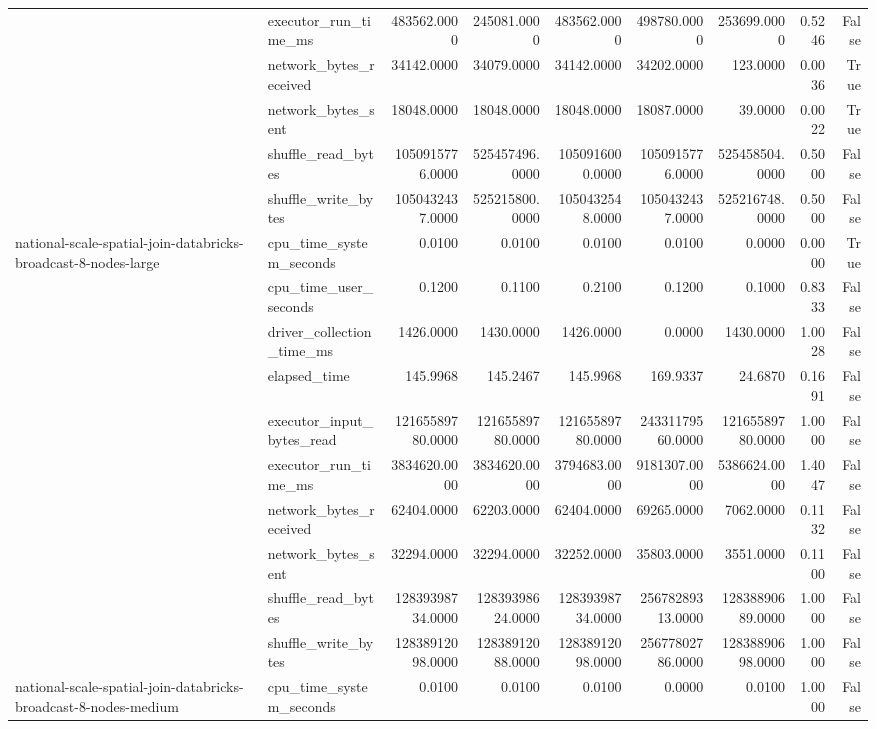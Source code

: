 \begin{tabular}{llrrrrrrr}
 & executor\_run\_time\_ms & 483562.0000 & 245081.0000 & 483562.0000 & 498780.0000 & 253699.0000 & 0.5246 & False \\
 & network\_bytes\_received & 34142.0000 & 34079.0000 & 34142.0000 & 34202.0000 & 123.0000 & 0.0036 & True \\
 & network\_bytes\_sent & 18048.0000 & 18048.0000 & 18048.0000 & 18087.0000 & 39.0000 & 0.0022 & True \\
 & shuffle\_read\_bytes & 1050915776.0000 & 525457496.0000 & 1050916000.0000 & 1050915776.0000 & 525458504.0000 & 0.5000 & False \\
 & shuffle\_write\_bytes & 1050432437.0000 & 525215800.0000 & 1050432548.0000 & 1050432437.0000 & 525216748.0000 & 0.5000 & False \\
\cline{1-9}
\multirow[t]{10}{*}{national-scale-spatial-join-databricks-broadcast-8-nodes-large} & cpu\_time\_system\_seconds & 0.0100 & 0.0100 & 0.0100 & 0.0100 & 0.0000 & 0.0000 & True \\
 & cpu\_time\_user\_seconds & 0.1200 & 0.1100 & 0.2100 & 0.1200 & 0.1000 & 0.8333 & False \\
 & driver\_collection\_time\_ms & 1426.0000 & 1430.0000 & 1426.0000 & 0.0000 & 1430.0000 & 1.0028 & False \\
 & elapsed\_time & 145.9968 & 145.2467 & 145.9968 & 169.9337 & 24.6870 & 0.1691 & False \\
 & executor\_input\_bytes\_read & 12165589780.0000 & 12165589780.0000 & 12165589780.0000 & 24331179560.0000 & 12165589780.0000 & 1.0000 & False \\
 & executor\_run\_time\_ms & 3834620.0000 & 3834620.0000 & 3794683.0000 & 9181307.0000 & 5386624.0000 & 1.4047 & False \\
 & network\_bytes\_received & 62404.0000 & 62203.0000 & 62404.0000 & 69265.0000 & 7062.0000 & 0.1132 & False \\
 & network\_bytes\_sent & 32294.0000 & 32294.0000 & 32252.0000 & 35803.0000 & 3551.0000 & 0.1100 & False \\
 & shuffle\_read\_bytes & 12839398734.0000 & 12839398624.0000 & 12839398734.0000 & 25678289313.0000 & 12838890689.0000 & 1.0000 & False \\
 & shuffle\_write\_bytes & 12838912098.0000 & 12838912088.0000 & 12838912098.0000 & 25677802786.0000 & 12838890698.0000 & 1.0000 & False \\
\cline{1-9}
\multirow[t]{10}{*}{national-scale-spatial-join-databricks-broadcast-8-nodes-medium} & cpu\_time\_system\_seconds & 0.0100 & 0.0100 & 0.0100 & 0.0000 & 0.0100 & 1.0000 & False \\

\end{tabular}
